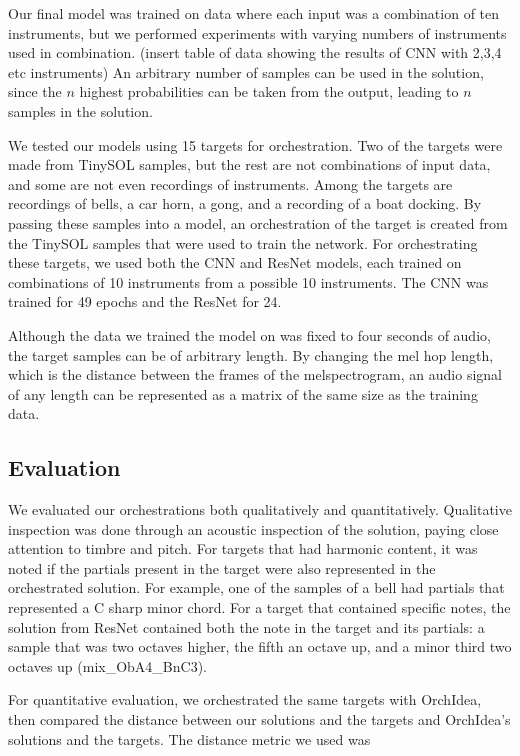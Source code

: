 \documentclass{article}
\begin{document}
Our final model was trained on data where each input was a combination of ten instruments, but we performed experiments with varying numbers of instruments used in combination. (insert table of data showing the results of CNN with 2,3,4 etc instruments) An arbitrary number of samples can be used in the solution, since the $n$ highest probabilities can be taken from the output, leading to $n$ samples in the solution.

We tested our models using 15 targets for orchestration. Two of the targets were made from TinySOL samples, but the rest are not combinations of input data, and some are not even recordings of instruments. Among the targets are recordings of bells, a car horn, a gong, and a recording of a boat docking. By passing these samples into a model, an orchestration of the target is created from the TinySOL samples that were used to train the network. For orchestrating these targets, we used both the CNN and ResNet models, each trained on combinations of 10 instruments from a possible 10 instruments. The CNN was trained for 49 epochs and the ResNet for 24.

Although the data we trained the model on was fixed to four seconds of audio, the target samples can be of arbitrary length. By changing the mel hop length, which is the distance between the frames of the melspectrogram, an audio signal of any length can be represented as a matrix of the same size as the training data.

\subsection{Evaluation}

We evaluated our orchestrations both qualitatively and quantitatively. Qualitative inspection was done through an acoustic inspection of the solution, paying close attention to timbre and pitch. For targets that had harmonic content, it was noted if the partials present in the target were also represented in the orchestrated solution. For example, one of the samples of a bell had partials that represented a C sharp minor chord. For a target that contained specific notes, the solution from ResNet contained both the note in the target and its partials: a sample that was two octaves higher, the fifth an octave up, and a minor third two octaves up (mix\_ObA4\_BnC3).

For quantitative evaluation, we orchestrated the same targets with OrchIdea, then compared the distance between our solutions and the targets and OrchIdea's solutions and the targets. The distance metric we used was 
\end{document}
